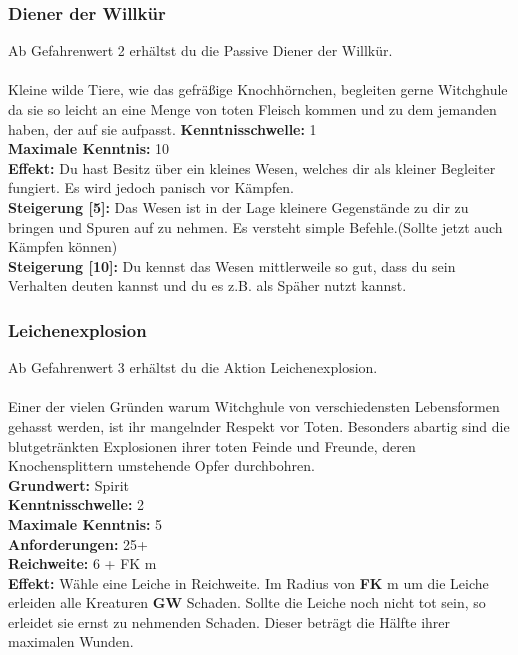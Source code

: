 \subsubsection*{ Diener der Willkür} \label{sk:dienerderwillkür}
Ab Gefahrenwert 2 erhältst du die Passive Diener der Willkür.\\
\\
Kleine wilde Tiere, wie das gefräßige Knochhörnchen, begleiten gerne Witchghule da sie so leicht an eine Menge von toten Fleisch kommen und zu dem jemanden haben, der auf sie aufpasst.
\textbf{Kenntnisschwelle:} 1 \\
\textbf{Maximale Kenntnis:} 10 \\
\textbf{Effekt:} Du hast Besitz über ein kleines Wesen, welches dir als kleiner Begleiter fungiert. Es wird jedoch panisch vor Kämpfen. \\
\textbf{Steigerung [5]:} Das Wesen ist in der Lage kleinere Gegenstände zu dir zu bringen und Spuren auf zu nehmen. Es versteht simple Befehle.(Sollte jetzt auch Kämpfen können) \\
\textbf{Steigerung [10]:} Du kennst das Wesen mittlerweile so gut, dass du sein Verhalten deuten kannst und du es z.B. als Späher nutzt kannst.

\subsubsection*{ Leichenexplosion} \label{sk:leichenexplosion}
Ab Gefahrenwert 3 erhältst du die Aktion Leichenexplosion.\\
\\
Einer der vielen Gründen warum Witchghule von verschiedensten Lebensformen gehasst werden, ist ihr mangelnder Respekt vor Toten. Besonders abartig sind die blutgetränkten Explosionen ihrer toten Feinde und Freunde, deren Knochensplittern umstehende Opfer durchbohren. \\
\textbf{Grundwert:} Spirit \\
\textbf{Kenntnisschwelle:} 2 \\
\textbf{Maximale Kenntnis:} 5 \\
\textbf{Anforderungen:} 25+ \\
\textbf{Reichweite:} 6 + FK m \\
\textbf{Effekt:} Wähle eine Leiche in Reichweite. Im Radius von \textbf{FK} m um die Leiche erleiden alle Kreaturen \textbf{GW} Schaden. Sollte die Leiche noch nicht tot sein, so erleidet sie ernst zu nehmenden Schaden. Dieser beträgt die Hälfte ihrer maximalen Wunden.


